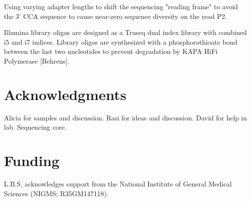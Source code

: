 \documentclass[9pt,lineno]{elife}
\begin{document}
Using varying adapter lengths to shift the sequencing "reading frame"  to avoid the 3' CCA sequence to cause near-zero sequence diversity on the read P2.

Illumina library oligos are designed as a Truseq dual index library with combined i5 and i7 indices.
Library oligos are synthesized with a phosphorothioate bond between the last two nucleotides to prevent degradation by KAPA HiFi Polymerase [Behrens].






\section{Acknowledgments}
Alicia for samples and discussion.
Rasi for ideas and discussion.
David for help in lab.
Sequencing core.

\section{Funding}
L.B.S. acknowledges support from the National Institute of General Medical Sciences (NIGMS; R35GM147118).



\end{document}

